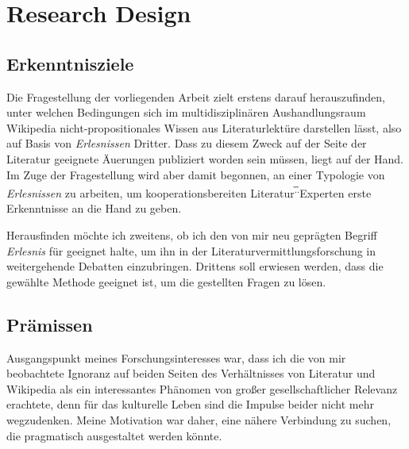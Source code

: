\documentclass[fontsize=12pt]{scrartcl}
\begin{document}
\pagebreak

\section{Research Design}
\label{sec:2}

\subsection{Erkenntnisziele}
\label{subsec:2.1}

Die Fragestellung der vorliegenden Arbeit zielt erstens darauf he\-rauszufinden, unter welchen Bedingungen sich im multidisziplin\"aren Aushandlungsraum Wi\-ki\-pe\-dia nicht-pro\-po\-si\-ti\-o\-na\-les Wissen aus Li\-te\-ra\-tur\-lekt\"ure dar\-stel\-len l\"asst, also auf Basis von \textit{Erlesnissen} Dritter. Dass zu diesem Zweck auf der Seite der Li\-te\-ra\-tur ge\-eig\-nete \"Au\-{\ss}e\-run\-gen pu\-bli\-ziert worden sein m\"ussen, liegt auf der Hand. Im Zuge der Fragestellung wird aber damit begonnen, an einer Typologie von \textit{Erlesnissen} zu arbeiten, um kooperationsbereiten Li\-te\-ra\-tur\textsuperscript{\~.\~.}Experten\textsuperscript{\tiny *} erste Erkenntnisse an die Hand zu geben. 

He\-rausfinden m\"ochte ich zweitens, ob ich den von mir neu gepr\"agten Begriff \textit{Erlesnis} f\"ur ge\-eig\-net halte, um ihn in der Li\-te\-ra\-tur\-ver\-mitt\-lungsfor\-schung in weitergehende Debatten einzubringen. Drittens soll erwiesen werden, dass die gew\"ahlte Methode ge\-eig\-net ist, um die gestellten Fragen zu l\"osen.

\subsection{Pr\"amissen}
\label{subsec:2.2}

Ausgangspunkt meines For\-schungsinteresses war, dass ich die von mir beobachtete Ignoranz auf beiden Seiten des Verh\"altnisses von Li\-te\-ra\-tur und Wi\-ki\-pe\-dia als ein interessantes Ph\"anomen von gro{\ss}er ge\-sell\-schaftlicher Relevanz erachtete, denn f\"ur das kulturelle Leben sind die Impulse beider nicht mehr wegzudenken. Meine Motivation war daher, eine n\"ahere Verbindung zu suchen, die pragmatisch ausgestaltet werden k\"onnte.
\end{document}
